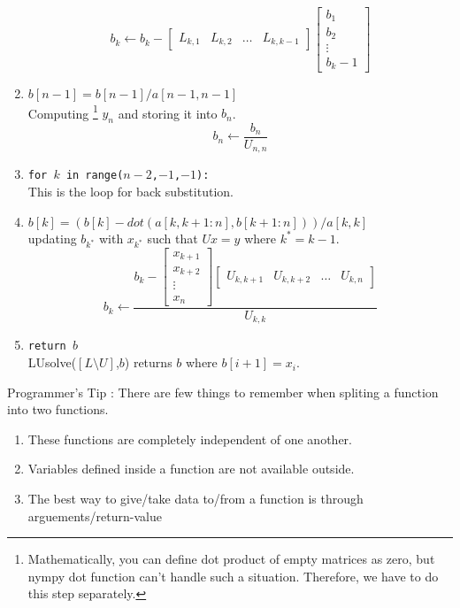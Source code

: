 \begin{commentary}
\begin{enumerate}[label=Line \arabic*]
	\[ b_k \leftarrow b_k - \begin{bmatrix} L_{k,1} & L_{k,2} & \dots & L_{k,k-1} \end{bmatrix} \begin{bmatrix} b_1 \\ b_2 \\ \vdots \\ b_k-1 \end{bmatrix} \]
	\item \texttt{$b[n-1] = b[n-1]/a[n-1,n-1]$} \\ Computing
		\footnote{
			Mathematically, you can define dot product of empty matrices as zero, but nympy dot function can't handle such a situation.
		Therefore, we have to do this step separately.
		}
		$y_n$ and storing it into $b_n$.
	\[b_n \leftarrow \frac{b_n}{U_{n,n}}\]
	\item \texttt{for $k$ in range($n-2$,$-1$,$-1$):}  \\ This is the loop for back substitution.
	\item \texttt{$b[k] = (b[k] - dot(a[k,k+1:n],b[k+1:n]))/a[k,k]$} \\ updating $b_{k^*}$ with $x_{k^*}$ such that $Ux = y$ where $k^* = k-1$.
	\[ b_k \leftarrow \frac{b_k - \begin{bmatrix} x_{k+1} \\ x_{k+2} \\ \vdots \\ x_n \end{bmatrix} \begin{bmatrix} U_{k,k+1} & U_{k,k+2} & \dots & U_{k,n} \end{bmatrix}}{U_{k,k}} \]
	\item \texttt{return $b$} \\ LUsolve($[L\text{\textbackslash{}}U]$,$b$) returns $b$ where $b[i+1]=x_i$.
\end{enumerate}

	Programmer's Tip : There are few things to remember when spliting a function into two functions.
\begin{enumerate}
	\item These functions are completely independent of one another.
	\item Variables defined inside a function are not available outside.
	\item The best way to give/take data to/from a function is through arguements/return-value
\end{enumerate}


\end{commentary}
